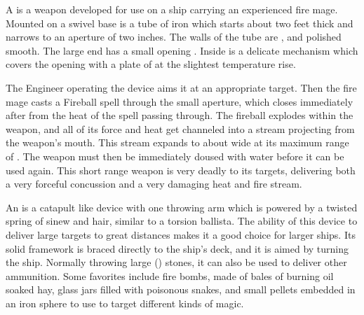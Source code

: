 \begin{multicols*}{2}
A  is a weapon developed for use on a ship carrying an experienced fire mage. Mounted on a swivel base is a  tube of iron which starts about two feet thick and narrows to an aperture of two inches. The walls of the tube are , and polished smooth. The large end has a small opening . Inside is a delicate mechanism which covers the opening with a plate of  at the slightest temperature rise.

The Engineer operating the device aims it at an appropriate target. Then the fire mage casts a Fireball spell through the small aperture, which closes immediately after from the heat of the spell passing through. The fireball explodes within the weapon, and all of its force and heat get channeled into a  stream projecting from the weapon's mouth. This stream expands to about  wide at its maximum range of . The weapon must then be immediately doused with water before it can be used again. This short range weapon is very deadly to its targets, delivering both a very forceful concussion and a very damaging heat and fire stream. 

An  is a catapult like device with one throwing arm which is powered by a twisted spring of sinew and hair, similar to a torsion ballista. The ability of this device to deliver large targets to great distances makes it a good choice for larger ships. Its solid framework is braced directly to the ship's deck, and it is aimed by turning the ship. Normally throwing large () stones, it can also be used
to deliver other ammunition. Some favorites include fire bombs, made of bales of burning oil soaked hay, glass jars filled with poisonous snakes, and small  pellets embedded in an iron sphere to use to target different kinds of magic.


\end{multicols*}
